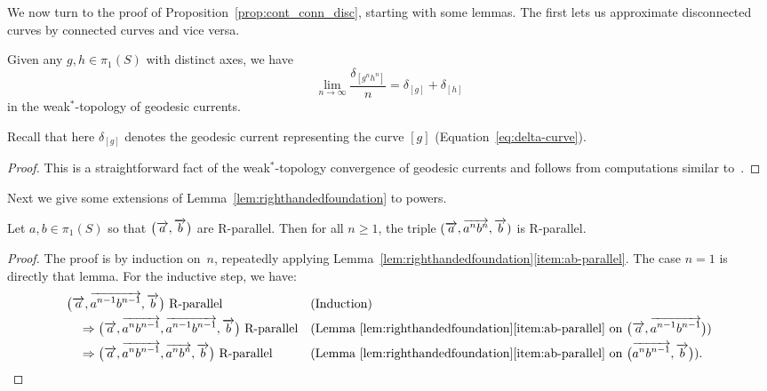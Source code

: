 We now turn to the proof of Proposition~\ref{prop:cont_conn_disc},
starting with some lemmas. The first lets us approximate
disconnected curves by connected curves and vice versa.
\begin{lemma}
  Given any $g,h \in \pi_1(S)$ with distinct axes, we have
\[
\lim_{n\to\infty} \frac{\delta_{[g^n h^n]}}{n} = \delta_{[g]} + \delta_{[h]}
\]
in the weak$^*$-topology of geodesic currents.
\label{lem:gnhn_to_gsumh}
\end{lemma}

Recall that here $\delta_{[g]}$ denotes the geodesic current representing the curve $[g]$ (Equation~\eqref{eq:delta-curve}).

\begin{proof}
  This is a straightforward fact of the weak$^*$-topology convergence
  of geodesic currents and follows from computations similar
  to~\cite[Proposition~5.1]{Sas22:Currents}.
\end{proof}

Next we give some extensions of Lemma~\ref{lem:righthandedfoundation}
to powers.
\begin{lemma}
  Let  $a,b \in \pi_1(S)$ so that $\bigl(\overrightarrow{a},\overrightarrow{b}\bigr)$ are
  R-parallel. Then for all
  $n \ge 1$, the triple $(\overrightarrow{a},\overrightarrow{a^n b^n}, \overrightarrow{b})$ is R-parallel.
  \label{lem:powers_parallel}
\end{lemma}
\begin{proof}
The proof is by induction on~$n$, repeatedly applying
Lemma~\ref{lem:righthandedfoundation}\ref{item:ab-parallel}. The case
$n=1$ is directly that lemma.
For the inductive step, we have:
\begin{align*}
  &\bigl(\overrightarrow{a},\overrightarrow{a^{n-1}b^{n-1}},\overrightarrow{b}\bigr)\text{ R-parallel}
    &&\text{(Induction)}\\
  &\quad\Rightarrow
    \bigl(\overrightarrow{a},\overrightarrow{a^n b^{n-1}},\overrightarrow{a^{n-1}b^{n-1}},\overrightarrow{b}\bigr)\text{ R-parallel}
    &&\text{(Lemma~\ref{lem:righthandedfoundation}\ref{item:ab-parallel} on
$\bigl(\overrightarrow{a},\overrightarrow{a^{n-1}b^{n-1}}\bigr)$)}\\
  &\quad\Rightarrow
    \bigl(\overrightarrow{a},\overrightarrow{a^n b^{n-1}},\overrightarrow{a^n b^n},\overrightarrow{b}\bigr)\text{ R-parallel}
    &&\text{(Lemma~\ref{lem:righthandedfoundation}\ref{item:ab-parallel} on
$\bigl(\overrightarrow{a^n b^{n-1}},\overrightarrow{b}\bigr)$)}.
\qedhere
\end{align*}
\end{proof}

